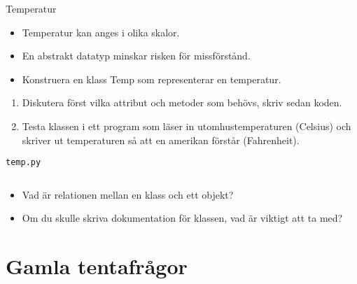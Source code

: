 \begin{frame}
  \begin{block}{Temperatur}
    \begin{itemize}
      \item Temperatur kan anges i olika skalor.
      \item En abstrakt datatyp minskar risken för missförstånd.
    \end{itemize}
  \end{block}
  \begin{exercise}
    \begin{itemize}
      \item Konstruera en klass Temp som representerar en temperatur.
    \end{itemize}
    \begin{enumerate}
      \item Diskutera först vilka attribut och metoder som behövs, skriv sedan 
        koden.
        \pause
      \item Testa klassen i ett program som läser in utomhustemperaturen 
        (Celsius) och skriver ut temperaturen så att en amerikan förstår 
        (Fahrenheit).
    \end{enumerate}
  \end{exercise}
\end{frame}

\begin{frame}[fragile]
  \texttt{temp.py}\hrulefill
  \inputminted{python}{src/temp.py}
\end{frame}

\begin{frame}
  \begin{question}
    \begin{itemize}
      \item Vad är relationen mellan en klass och ett objekt?
      \item Om du skulle skriva dokumentation för klassen, vad är viktigt att 
        ta med?
    \end{itemize}
  \end{question}
\end{frame}


\section{Gamla tentafrågor}

